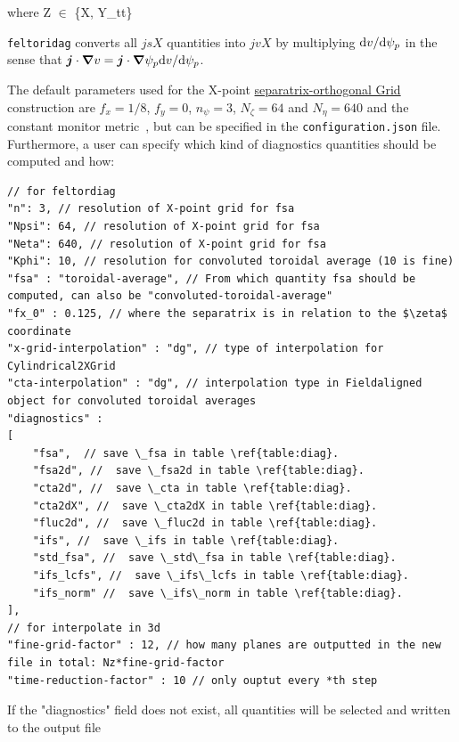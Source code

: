 where Z $\in$ \{X, Y\_tt\}
\begin{tcolorbox}[title=Note]
    \texttt{feltoridag} converts all $jsX$ quantities into $jvX$
by multiplying $\mathrm{d} v/\mathrm{d} \psi_p$
in the sense that ${\boldsymbol{j}}\cdot{\boldsymbol{\nabla}} v  = {\boldsymbol{j}} \cdot{\boldsymbol{\nabla}} \psi_p \mathrm{d} v/\mathrm{d}\psi_p$.
\end{tcolorbox}
The default parameters used for the X-point
\href{https://feltor-dev.github.io/doc/geometries/html/structdg_1_1geo_1_1_separatrix_orthogonal.html}{separatrix-orthogonal Grid}
construction are $f_x = 1/8$, $f_y = 0$, $n_\psi = 3$, $N_\zeta = 64$ and
$N_\eta = 640$ and the constant monitor metric~\cite{Wiesenberger2018}, but can be specified in the \texttt{configuration.json} file.
Furthermore, a user can specify which kind of diagnostics quantities should be computed and how:
\begin{verbatim}
// for feltordiag
"n": 3, // resolution of X-point grid for fsa
"Npsi": 64, // resolution of X-point grid for fsa
"Neta": 640, // resolution of X-point grid for fsa
"Kphi": 10, // resolution for convoluted toroidal average (10 is fine)
"fsa" : "toroidal-average", // From which quantity fsa should be computed, can also be "convoluted-toroidal-average"
"fx_0" : 0.125, // where the separatrix is in relation to the $\zeta$ coordinate
"x-grid-interpolation" : "dg", // type of interpolation for Cylindrical2XGrid
"cta-interpolation" : "dg", // interpolation type in Fieldaligned object for convoluted toroidal averages
"diagnostics" :
[
    "fsa",  // save \_fsa in table \ref{table:diag}.
    "fsa2d", //  save \_fsa2d in table \ref{table:diag}.
    "cta2d", //  save \_cta in table \ref{table:diag}.
    "cta2dX", //  save \_cta2dX in table \ref{table:diag}.
    "fluc2d", //  save \_fluc2d in table \ref{table:diag}.
    "ifs", //  save \_ifs in table \ref{table:diag}.
    "std_fsa", //  save \_std\_fsa in table \ref{table:diag}.
    "ifs_lcfs", //  save \_ifs\_lcfs in table \ref{table:diag}.
    "ifs_norm" //  save \_ifs\_norm in table \ref{table:diag}.
],
// for interpolate in 3d
"fine-grid-factor" : 12, // how many planes are outputted in the new file in total: Nz*fine-grid-factor
"time-reduction-factor" : 10 // only ouptut every *th step
\end{verbatim}
\begin{tcolorbox}[title=Note]
    If the "diagnostics" field does not exist, all quantities will be selected and written to the output file
\end{tcolorbox}


